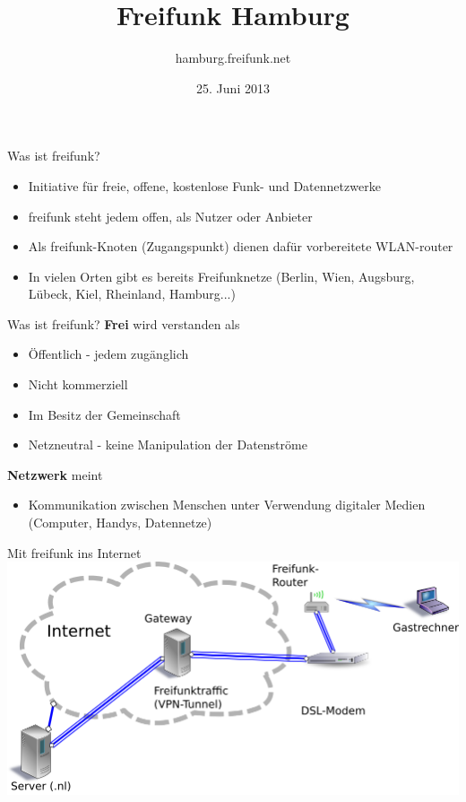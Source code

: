 \documentclass[c]{beamer}
\title{Freifunk Hamburg}
\author{hamburg.freifunk.net}
\date{25. Juni 2013}
\begin{document}
\maketitle

\begin{frame}{Was ist freifunk?}
	\begin{itemize}
		\item Initiative für freie, offene, kostenlose Funk- und Datennetzwerke
		\item freifunk steht jedem offen, als Nutzer oder Anbieter
		\item Als freifunk-Knoten (Zugangspunkt) dienen dafür vorbereitete WLAN-router
		\item In vielen Orten gibt es bereits Freifunknetze (Berlin, Wien, Augsburg, Lübeck, Kiel, Rheinland, Hamburg...)
	\end{itemize}
\end{frame}


\begin{frame}{Was ist freifunk?}
	\textbf{Frei} wird verstanden als
	\begin{itemize}
		\item Öffentlich - jedem zugänglich
		\item Nicht kommerziell
		\item Im Besitz der Gemeinschaft
		\item Netzneutral - keine Manipulation der Datenströme
	\end{itemize}
	\textbf{Netzwerk} meint
	\begin{itemize}
		\item Kommunikation zwischen Menschen unter Verwendung digitaler Medien (Computer, Handys, Datennetze)
	\end{itemize}
\end{frame}


\begin{frame}{Mit freifunk ins Internet}
	\includegraphics[width=\textwidth]{Freifunk_Knotenanbindung}
\end{frame}
\end{document}
